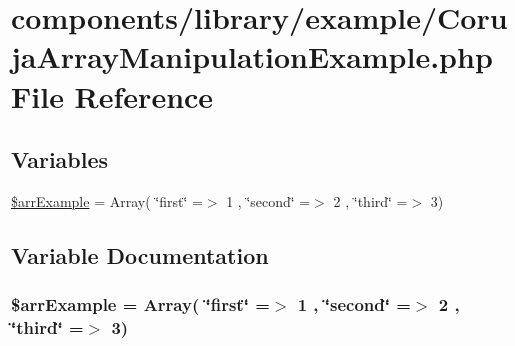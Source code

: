 \hypertarget{_coruja_array_manipulation_example_8php}{
\section{components/library/example/CorujaArrayManipulationExample.php File Reference}
\label{_coruja_array_manipulation_example_8php}
}
\subsection*{Variables}
\begin{CompactItemize}
\item 
\hyperlink{_coruja_array_manipulation_example_8php_d73fd072ead4aea41bde966e0a3bbe10}{\$arrExample} = Array( \char`\"{}first\char`\"{} =$>$ 1 , \char`\"{}second\char`\"{} =$>$ 2 , \char`\"{}third\char`\"{} =$>$ 3)
\end{CompactItemize}


\subsection{Variable Documentation}
\hypertarget{_coruja_array_manipulation_example_8php_d73fd072ead4aea41bde966e0a3bbe10}{
\subsubsection[{\$arrExample}]{\setlength{\rightskip}{0pt plus 5cm}\$arrExample = Array( \char`\"{}first\char`\"{} =$>$ 1 , \char`\"{}second\char`\"{} =$>$ 2 , \char`\"{}third\char`\"{} =$>$ 3)}}
\label{_coruja_array_manipulation_example_8php_d73fd072ead4aea41bde966e0a3bbe10}


